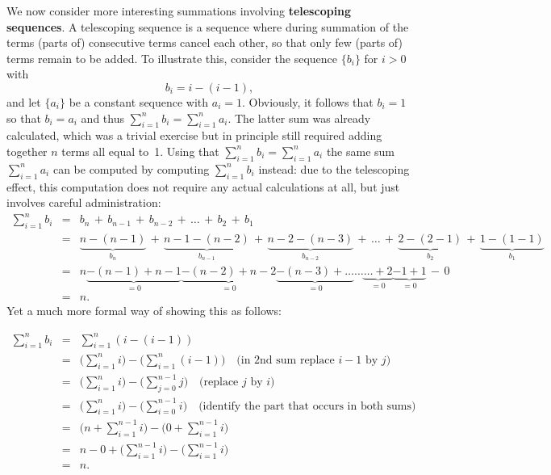 \documentclass{article}
\theoremstyle{definition}
\numberwithin{equation}{subsection}
\numberwithin{remark}{subsection}
\begin{document}
We now consider more interesting summations involving \textbf{telescoping sequences}. A telescoping sequence is a sequence where during summation of the terms (parts of) consecutive terms cancel each other, so that only few (parts of) terms remain to be added.
To illustrate this, consider the sequence $\{b_i\}$ for $i>0$ with $$b_i=i-(i-1),$$
and let $\{a_i\}$ be a constant sequence with $a_i=1$.
Obviously, it follows that $b_i=1$ so that $b_i=a_i$ and thus $\sum_{i=1}^nb_i=\sum_{i=1}^na_i$. The latter sum was already calculated, which was a trivial exercise but in principle still required adding together $n$ terms all equal to~1. Using that $\sum_{i=1}^nb_i=\sum_{i=1}^na_i$ the same sum $\sum_{i=1}^na_i$ can be computed by computing $\sum_{i=1}^nb_i$ instead: due to the telescoping effect, this computation does not require any actual calculations at all, but just involves careful administration:
\begin{eqnarray*}
\sum_{i=1}^nb_i&=&b_n\,+\,b_{n-1}\,+\,b_{n-2}\,+\,\ldots\,+\,b_2\,+\,b_1\\
&=&\underbrace{n-(n-1)}_{b_n}\,+\,\underbrace{n-1-(n-2)}_{b_{n-1}}\,+\,\underbrace{n-2-(n-3)}_{b_{n-2}}\,+\,\ldots\,+\,\underbrace{2-(2-1)}_{b_{2}}\,+\,\underbrace{1-(1-1)}_{b_{1}}\\
&=&n\underbrace{-(n-1)+n-1}_{=0}\underbrace{-(n-2)+n-2}_{=0}\underbrace{-(n-3)+\ldots}_{=0}\ldots\underbrace{\ldots+2}_{=0}\underbrace{-1+1}_{=0}\,-\,0\\
&=&n.
\end{eqnarray*}
\clearpage
Yet a much more formal way of showing this as follows:

\begin{eqnarray*}
\sum_{i=1}^nb_i&=&\sum_{i=1}^n(i-(i-1))\\
&=&\Big(\sum_{i=1}^ni\Big)-\Big(\sum_{i=1}^n(i-1)\Big)\,\,\,\,\text{     (in 2nd sum replace $i-1$ by $j$)} \\
&=&\Big(\sum_{i=1}^{n}i\Big)-\Big(\sum_{j=0}^{n-1}j\Big)\,\,\,\,\text{     (replace $j$ by $i$)} \\
&=&\Big(\sum_{i=1}^{n}i\Big)-\Big(\sum_{i=0}^{n-1}i\Big)\,\,\,\,\text{     (identify the part that occurs in both sums)} \\
&=&\Big(n+\sum_{i=1}^{n-1}i\Big)-\Big(0+\sum_{i=1}^{n-1}i\Big)\\
&=&n-0+\Big(\sum_{i=1}^{n-1}i\Big)-\Big(\sum_{i=1}^{n-1}i\Big)\\
&=&n.
\end{eqnarray*}
\end{document}
